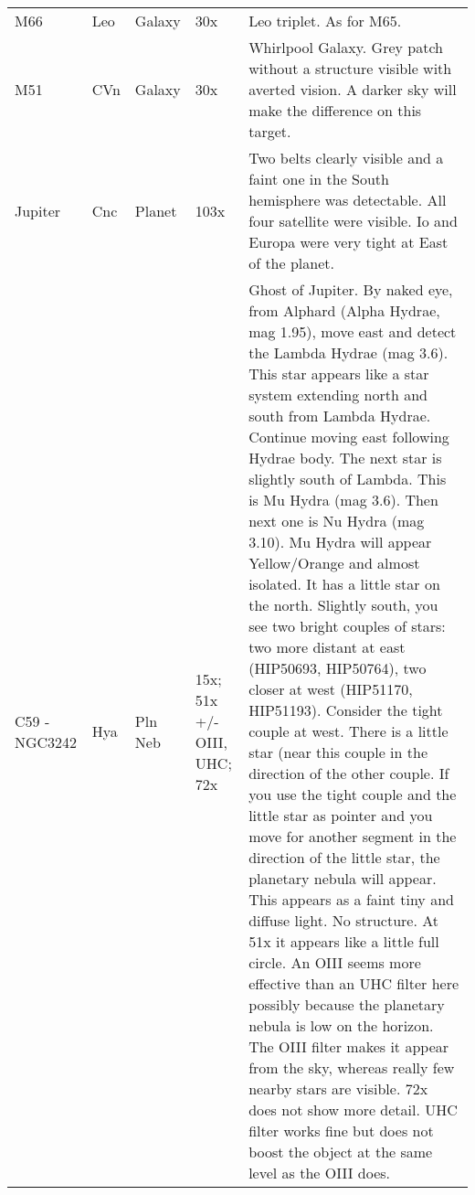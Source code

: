 \begin{longtable}{ p{0.7in}  p{0.3in}  p{0.6in}  p{0.9in}  p{5.8in} }
M66 & Leo & Galaxy & 30x & Leo triplet. As for M65.  \\ 
M51 & CVn & Galaxy & 30x & Whirlpool Galaxy. Grey patch without a structure visible with averted vision. A darker sky will make the difference on this target. \\ 
Jupiter & Cnc & Planet & 103x & Two belts clearly visible and a faint one in the South hemisphere was detectable. All four satellite were visible. Io and Europa were very tight at East of the planet. \\ 
C59 - NGC3242 & Hya & Pln Neb & 15x; 51x +/- OIII, UHC; 72x & Ghost of Jupiter. By naked eye, from Alphard (Alpha Hydrae, mag 1.95), move east and detect the Lambda Hydrae (mag 3.6). This star appears like a star system extending north and south from Lambda Hydrae. Continue moving east following Hydrae body. The next star is slightly south of Lambda. This is Mu Hydra (mag 3.6). Then next one is Nu Hydra (mag 3.10). Mu Hydra will appear Yellow/Orange and almost isolated. It has a little star on the north. Slightly south, you see two bright couples of stars: two more distant at east (HIP50693, HIP50764), two closer at west (HIP51170, HIP51193). Consider the tight couple at west. There is a little star (near this couple in the direction of the other couple. If you use the tight couple and the little star as pointer and you move for another segment in the direction of the little star, the planetary nebula will appear. This appears as a faint tiny and diffuse light. No structure. At 51x it appears like a little full circle. An OIII seems more effective than an UHC filter here possibly because the planetary nebula is low on the horizon. The OIII filter makes it appear from the sky, whereas really few nearby stars are visible. 72x does not show more detail. UHC filter works fine but does not boost the object at the same level as the OIII does. \\ 
\hline 
\end{longtable} 

